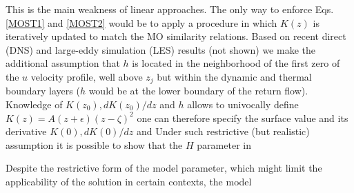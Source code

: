 This is the main weakness of linear approaches. The only way to enforce Eqs. \ref{MOST1} and \ref{MOST2} would be to apply a procedure in which $K(z)$ is iteratively updated to match the MO similarity relations.
Based on recent direct (DNS) and large-eddy simulation (LES) results (not shown) we make the additional assumption that $h$ is located in the neighborhood of the first zero of the $u$ velocity profile, well above $z_j$ but within the dynamic and thermal boundary layers ($h$ would be at the lower boundary of the return flow).
Knowledge of $K(z_0),dK(z_0)/dz$ and $h$ allows to univocally define $K(z)= A(z + \epsilon)(z-\zeta)^2$ one can therefore specify the surface value and its derivative $K(0), dK(0)/dz$ and 
Under such restrictive (but realistic) assumption it is possible to show that the $H$ parameter in 

Despite the restrictive form of the model parameter, which might limit the applicability of the solution in certain contexts, the model 








